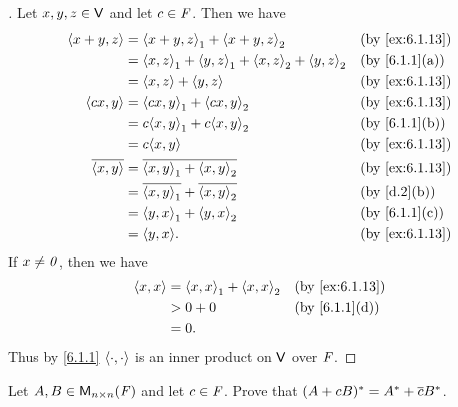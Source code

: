 \begin{proof}[]
  Let \(x, y, z \in \mathsf{V}\) and let \(c \in \mathit{F}\).
  Then we have
  \begin{align*}
    \inn{x + y, z}    & = \inn{x + y, z}_1 + \inn{x + y, z}_2                       &  & \text{(by \cref{ex:6.1.13})} \\
                      & = \inn{x, z}_1 + \inn{y, z}_1 + \inn{x, z}_2 + \inn{y, z}_2 &  & \text{(by \cref{6.1.1}(a))}  \\
                      & = \inn{x, z} + \inn{y, z}                                   &  & \text{(by \cref{ex:6.1.13})} \\
    \inn{cx, y}       & = \inn{cx, y}_1 + \inn{cx, y}_2                             &  & \text{(by \cref{ex:6.1.13})} \\
                      & = c \inn{x, y}_1 + c \inn{x, y}_2                           &  & \text{(by \cref{6.1.1}(b))}  \\
                      & = c \inn{x, y}                                              &  & \text{(by \cref{ex:6.1.13})} \\
    \conj{\inn{x, y}} & = \conj{\inn{x, y}_1 + \inn{x, y}_2}                        &  & \text{(by \cref{ex:6.1.13})} \\
                      & = \conj{\inn{x, y}_1} + \conj{\inn{x, y}_2}                 &  & \text{(by \cref{d.2}(b))}    \\
                      & = \inn{y, x}_1 + \inn{y, x}_2                               &  & \text{(by \cref{6.1.1}(c))}  \\
                      & = \inn{y, x}.                                               &  & \text{(by \cref{ex:6.1.13})}
  \end{align*}
  If \(x \neq \mathit{0}\), then we have
  \begin{align*}
    \inn{x, x} & = \inn{x, x}_1 + \inn{x, x}_2 &  & \text{(by \cref{ex:6.1.13})} \\
               & > 0 + 0                       &  & \text{(by \cref{6.1.1}(d))}  \\
               & = 0.
  \end{align*}
  Thus by \cref{6.1.1} \(\left\langle\cdot, \cdot\right\rangle\) is an inner product on \(\mathsf{V}\) over \(\mathit{F}\).
\end{proof}

\begin{ex}\label{ex:6.1.14}
  Let \(A, B \in \mathsf{M}_{{n} \times n}({\mathit{F}})\) and let \(c \in \mathit{F}\).
  Prove that \((A + cB)^* = A^* + \overline{c} B^*\).
\end{ex}

